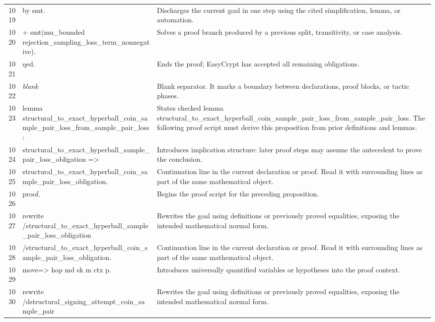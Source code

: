 \documentclass[10pt]{article}
\begin{document}
\begin{longtable}{r L{0.53\textwidth} L{0.37\textwidth}}
1019 & {\ttfamily\scriptsize   by smt.} & Discharges the current goal in one step using the cited simplification, lemma, or automation. \\
1020 & {\ttfamily\scriptsize + smt(mu\_bounded rejection\_sampling\_loss\_term\_nonnegative).} & Solves a proof branch produced by a previous split, transitivity, or case analysis. \\
1021 & {\ttfamily\scriptsize qed.} & Ends the proof; EasyCrypt has accepted all remaining obligations. \\
1022 & {\ttfamily\scriptsize \emph{blank}} & Blank separator.  It marks a boundary between declarations, proof blocks, or tactic phases. \\
1023 & {\ttfamily\scriptsize lemma structural\_to\_exact\_hyperball\_coin\_sample\_pair\_loss\_from\_sample\_pair\_loss :} & States checked lemma structural\_to\_exact\_hyperball\_coin\_sample\_pair\_loss\_from\_sample\_pair\_loss.  The following proof script must derive this proposition from prior definitions and lemmas. \\
1024 & {\ttfamily\scriptsize   structural\_to\_exact\_hyperball\_sample\_pair\_loss\_obligation =>} & Introduces implication structure: later proof steps may assume the antecedent to prove the conclusion. \\
1025 & {\ttfamily\scriptsize   structural\_to\_exact\_hyperball\_coin\_sample\_pair\_loss\_obligation.} & Continuation line in the current declaration or proof.  Read it with surrounding lines as part of the same mathematical object. \\
1026 & {\ttfamily\scriptsize proof.} & Begins the proof script for the preceding proposition. \\
1027 & {\ttfamily\scriptsize rewrite /structural\_to\_exact\_hyperball\_sample\_pair\_loss\_obligation} & Rewrites the goal using definitions or previously proved equalities, exposing the intended mathematical normal form. \\
1028 & {\ttfamily\scriptsize         /structural\_to\_exact\_hyperball\_coin\_sample\_pair\_loss\_obligation.} & Continuation line in the current declaration or proof.  Read it with surrounding lines as part of the same mathematical object. \\
1029 & {\ttfamily\scriptsize move=> hop md sk m ctx p.} & Introduces universally quantified variables or hypotheses into the proof context. \\
1030 & {\ttfamily\scriptsize rewrite /dstructural\_signing\_attempt\_coin\_sample\_pair} & Rewrites the goal using definitions or previously proved equalities, exposing the intended mathematical normal form. \\

\end{longtable}
\end{document}
